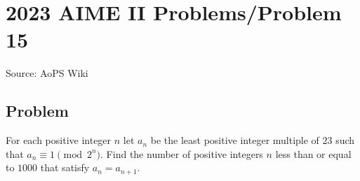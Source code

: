 \documentclass[12pt]{article}
\begin{document}
\section*{{2023 AIME II Problems/Problem 15}}
Source: AoPS Wiki

\subsection*{Problem}
For each positive integer $n$ let $a_n$ be the least positive integer multiple of $23$ such that $a_n \equiv 1 \pmod{2^n}.$ Find the number of positive integers $n$ less than or equal to $1000$ that satisfy $a_n = a_{n+1}.$
\end{document}
